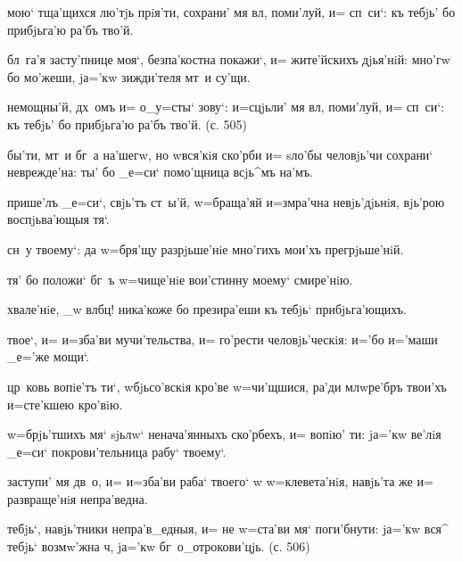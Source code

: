мою` тща'щихся лю'тjь прiя'ти, сохрани' мя вл, 
поми'луй, и= сп~си`: къ тебjь' бо прибjьга'ю ра'бъ тво'й.

бл~га'я засту'пнице моя`, безпа'костна покажи`, и= 
жите'йскихъ дjья'нiй: мно'гw бо мо'жеши, jа='кw 
зижди'теля мт~и су'щи.

немощны'й, дх~омъ и= о_у=сты` зову`: и=сцjьли' мя 
вл, поми'луй, и= сп~си`: къ тебjь' бо прибjьга'ю 
ра'бъ тво'й. (с. 505)

бы'ти, мт~и бг~а на'шегw, но w\т вся'кiя ско'рби и= 
sло'бы человjь'чи сохрани` неврежде'на: ты' бо _е=си` 
помо'щница всjь^мъ на'мъ.


прише'лъ _е=си`, свjь'тъ ст~ы'й, w=браща'яй и=з\ъ мра'чна 
невjь'дjьнiя, вjь'рою воспjьва'ющыя тя`.

сн~у твоему`: да w=бря'щу разрjьше'нiе мно'гихъ мои'хъ 
прегрjьше'нiй.

тя' бо положи` бг~ъ w=чище'нiе вои'стинну моему` 
смире'нiю.

хвале'нiе, _w вл бц! ника'коже бо презира'еши къ 
тебjь` прибjьга'ющихъ.

твое`, и= и=зба'ви мучи'тельства, и= го'рести 
человjь'ческiя: и='бо и='маши _е='же мощи`.


цр~ковь вопiе'тъ ти`, w\т бjьсо'вскiя кро'ве w=чи'щшися, 
ра'ди мл w\т ре'бръ твои'хъ и=сте'кшею кро'вiю.

w=брjь'тшихъ мя` sjьлw` ненача'янныхъ ско'рбехъ, и= 
вопiю' ти: jа='кw ве'лiя _е=си` покрови'тельница рабу` 
твоему`.

заступи' мя дв~о, и= и=зба'ви раба` твоего` w\т 
w=клевета'нiя, навjь'та же и= развраще'нiя непра'ведна.

тебjь`, навjь'тники непра'в_едныя, и= не w=ста'ви мя` 
поги'бнути: jа='кw вся^ тебjь` возмw'жна ч, jа='кw 
бг~о_отрокови'цjь. (с. 506)


